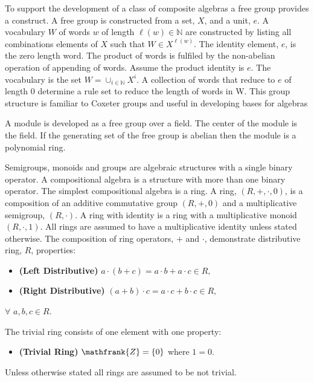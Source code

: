 \documentclass[aps,twocolumn,secnumarabic,nobalancelastpage,amsmath,amssymb,
nofootinbib,parskip=full]{revtex4}
\begin{document}
To support the development of a class of composite algebras a
free group provides a construct.
A free group is constructed from a set, $X$, and a unit, $e$.
A vocabulary $W$ of words $w$ of length $\ell(w)\in\mathbb{N}$ are constructed
by listing all combinations elements of $X$ such that $W\in X^{\ell(w)}$.
The identity element, $e$, is the zero length word.
The product of words is fulfiled by the non-abelian operation of 
appending of words.
Assume the product identity is $e$.
The vocabulary is the set $W={\cup}_{i\in\mathbb{N}}X^i$.
A collection of words that reduce to $e$ of length 0 determine a rule set
to reduce the length of words in W. 
This group structure is familiar to Coxeter groups and
useful in developing bases for algebras

A module is developed as a free group over a field. The center of the module
is the field.
If the generating set of the free group is abelian then the module is a polynomial ring. 

Semigroups, monoids and groups are algebraic structures 
with a single binary operator.
A compositional algebra is a structure with more than one 
binary operator. 
The simplest compositional algebra is a ring.
A ring, $(R,+,\cdot,0)$, is a composition of an 
additive commutative group $(R,+,0)$
and a multiplicative semigroup, $(R,\cdot)$.
A ring with identity is a ring with a 
multiplicative monoid $(R,\cdot,1)$.
All rings are assumed to have a multiplicative identity 
unless stated otherwise.
The composition of ring operators, $+$ and $\cdot$, 
demonstrate distributive ring, $R$, properties:

\begin{itemize}
\item \textbf{\small (Left Distributive)}
  $a\cdot(b + c)=a\cdot b+a\cdot c\in R,$
\item \textbf{\small (Right Distributive)}
  $(a+b)\cdot c=a\cdot c+b\cdot c\in R,$
\end{itemize}

\begin{center}
  $\forall$ $a,b,c\in R$.
\end{center}

The trivial ring consists of one element with one property:

\begin{itemize}
\item \textbf{(\small Trivial Ring)} $\mathfrank{Z}=\{0\}$ where $1=0$.
\end{itemize}

Unless otherwise stated all rings are assumed to be not trivial.
\end{document}

